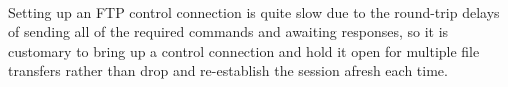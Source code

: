 \paragraph{}
Setting up an FTP control connection is quite slow due to the round-trip delays of sending all of the required commands and awaiting responses, so it is customary to bring up a control connection and hold it open for multiple file transfers rather than drop and re-establish the session afresh each time. 

\paragraph{} \textbf{}



